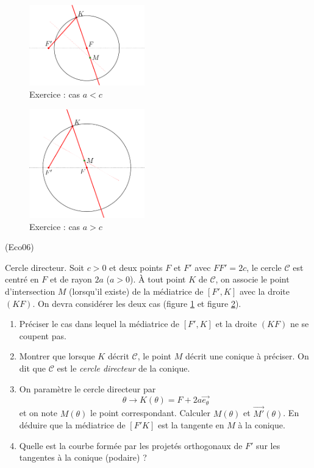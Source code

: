 \begin{figure}[ht]
 \centering
 \includegraphics[width=5cm]{Eco06_1.pdf}
 \caption{Exercice  : cas $a<c$}
 \label{fig:Eco6_1}
\end{figure}
\begin{figure}[ht]
 \centering
 \includegraphics[width=5cm]{Eco06_2.pdf}
 \caption{Exercice  : cas $a>c$}
 \label{fig:Eco6_2}
\end{figure}

\begin{tiny}(Eco06)\end{tiny} Cercle directeur.\newline
Soit $c>0$ et deux points $F$ et $F'$ avec $FF'=2c$, le cercle $\mathcal C$ est centré en $F$ et de rayon $2a$ ($a>0$).\newline
\`A tout point $K$ de $\mathcal C$, on associe le point d'intersection $M$ (lorsqu'il existe) de la médiatrice de $[F',K]$ avec la droite $(KF)$. On devra considérer les deux cas (figure \ref{fig:Eco6_1} et figure \ref{fig:Eco6_2}).
\begin{enumerate}
 \item Préciser le cas dans lequel la médiatrice de $[F',K]$ et la droite $(KF)$ ne se coupent pas.
 \item Montrer que lorsque $K$ décrit $\mathcal C$, le point $M$ décrit une conique à préciser. On dit que $\mathcal C$ est le \emph{cercle directeur} de la conique.
 \item On paramètre le cercle directeur par 
\begin{displaymath}
 \theta \rightarrow K(\theta) = F +2a\overrightarrow{e_\theta}
\end{displaymath}
et on note $M(\theta)$ le point correspondant. Calculer $M(\theta)$ et $\overrightarrow {M'} (\theta)$. En déduire que la médiatrice de $[F'K]$ est la tangente en $M$ à la conique.
\item Quelle est la courbe formée par les projetés orthogonaux de $F'$ sur les tangentes à la conique (podaire) ? 
\end{enumerate}

